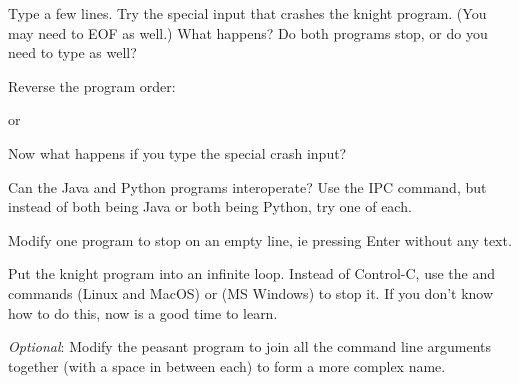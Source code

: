 Type a few lines. Try the special input that crashes the knight program. (You
may need to EOF as well.) What happens? Do both programs stop, or do you need to
type  as well?

Reverse the program order:

or

Now what happens if you type the special crash input?



Can the Java and Python programs interoperate? Use the IPC command, but instead
of both being Java or both being Python, try one of each.

Modify one program to stop on an empty line, ie pressing Enter without any text.

Put the knight program into an infinite loop. Instead of Control-C, use the
 and  commands (Linux and MacOS) or 
(MS Windows) to stop it. If you don't know how to do this, now is a good time
to learn.

\emph{Optional}: Modify the peasant program to join all the command line arguments
together (with a space in between each) to form a more complex name.


\COPYRIGHT


